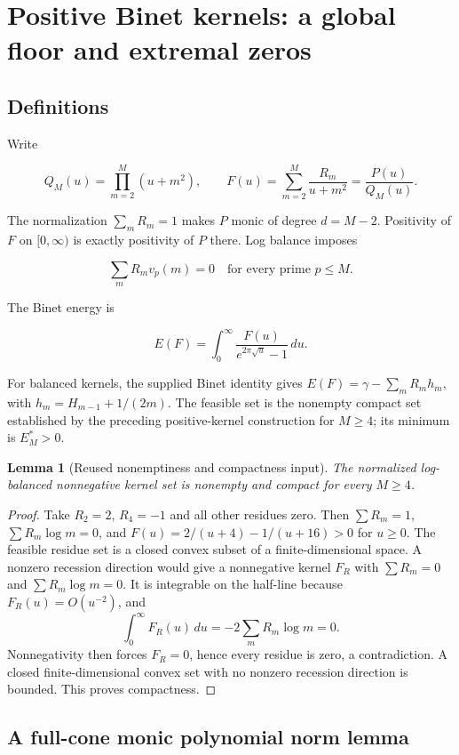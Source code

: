 \documentclass[11pt,a4paper]{article}
\newtheorem{lemma}[theorem]{Lemma}
\theoremstyle{definition}
\theoremstyle{remark}
\theoremstyle{plain}
\numberwithin{equation}{section}
\begin{document}
\section{Positive Binet kernels: a global floor and extremal
zeros}\label{sc:pk:positive-binet-kernels-a-global-floor-and-extremal-zeros}

\subsection{Definitions}\label{sc:pk:definitions}

Write

\[
Q_M(u)=\prod_{m=2}^M(u+m^2),\qquad
F(u)=\sum_{m=2}^M\frac{R_m}{u+m^2}=\frac{P(u)}{Q_M(u)}.
\]

The normalization \(\sum_m R_m=1\) makes \(P\) monic of degree
\(d=M-2\). Positivity of $F$ on $[0,\infty)$ is exactly positivity of $P$ there. Log balance imposes

\[
\sum_m R_m v_p(m)=0\quad\text{for every prime }p\le M.
\]

The Binet energy is

\[
E(F)=\int_0^\infty\frac{F(u)}{e^{2\pi\sqrt u}-1}\,du.
\]

For balanced kernels, the supplied Binet identity gives
\(E(F)=\gamma-\sum_m R_m h_m\), with \(h_m=H_{m-1}+1/(2m)\). The
feasible set is the nonempty compact set established by the preceding
positive-kernel construction for \(M\ge4\); its minimum is \(E_M^*>0\).

\begin{lemma}[Reused nonemptiness and compactness input]
The normalized log-balanced nonnegative kernel set is nonempty and compact
for every $M\ge4$.
\end{lemma}
\begin{proof}
Take $R_2=2$, $R_4=-1$ and all other residues zero. Then
$\sum R_m=1$, $\sum R_m\log m=0$, and
$F(u)=2/(u+4)-1/(u+16)>0$ for $u\ge0$.
The feasible residue set is a closed convex subset of a finite-dimensional
space. A nonzero recession direction would give a nonnegative kernel
$F_R$ with $\sum R_m=0$ and $\sum R_m\log m=0$.
It is integrable on the half-line because $F_R(u)=O(u^{-2})$, and
\[
\int_0^\infty F_R(u)\,du=-2\sum_mR_m\log m=0.
\]
Nonnegativity then forces $F_R=0$, hence every residue is zero, a
contradiction. A closed finite-dimensional convex set with no nonzero
recession direction is bounded. This proves compactness.
\end{proof}

\subsection{A full-cone monic polynomial norm
lemma}\label{sc:pk:a-full-cone-monic-polynomial-norm-lemma}
\end{document}
